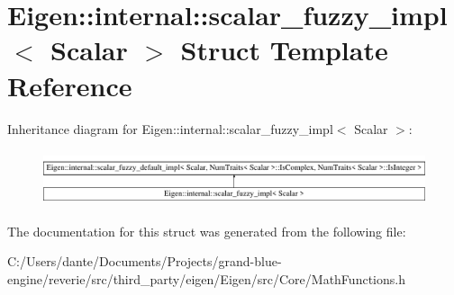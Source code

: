 \hypertarget{struct_eigen_1_1internal_1_1scalar__fuzzy__impl}{}\section{Eigen\+::internal\+::scalar\+\_\+fuzzy\+\_\+impl$<$ Scalar $>$ Struct Template Reference}
\label{struct_eigen_1_1internal_1_1scalar__fuzzy__impl}
Inheritance diagram for Eigen\+::internal\+::scalar\+\_\+fuzzy\+\_\+impl$<$ Scalar $>$\+:\begin{figure}[H]
\begin{center}
\leavevmode
\includegraphics[height=1.642229cm]{struct_eigen_1_1internal_1_1scalar__fuzzy__impl}
\end{center}
\end{figure}


The documentation for this struct was generated from the following file\+:\begin{DoxyCompactItemize}
\item 
C\+:/\+Users/dante/\+Documents/\+Projects/grand-\/blue-\/engine/reverie/src/third\+\_\+party/eigen/\+Eigen/src/\+Core/Math\+Functions.\+h\end{DoxyCompactItemize}
